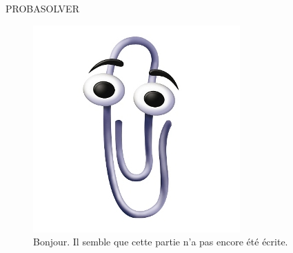 \newpage

PROBASOLVER

\begin{figure}[!htb]
\centering
\includegraphics[scale=2]{img/Trombi.jpg}
\caption{Bonjour. Il semble que cette partie n'a pas encore été écrite.}
\end{figure}

\newpage





